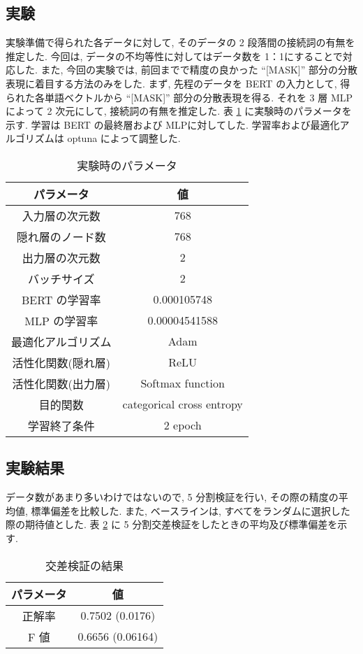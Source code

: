 \subsection{実験}
実験準備で得られた各データに対して, そのデータの 2 段落間の接続詞の有無を推定した.
今回は, データの不均等性に対してはデータ数を 1：1にすることで対応した.
また, 今回の実験では, 前回までで精度の良かった ``[MASK]'' 部分の分散表現に着目する方法のみをした.
まず, 先程のデータを BERT の入力として, 得られた各単語ベクトルから ``[MASK]'' 部分の分散表現を得る.
それを 3 層 MLP によって 2 次元にして, 接続詞の有無を推定した.
表 \ref{nn} に実験時のパラメータを示す.
学習は BERT の最終層および MLPに対してした.
学習率および最適化アルゴリズムは optuna によって調整した.
\begin{table}[ht] %
	\begin{center}
		\caption{実験時のパラメータ}
		\label{nn}
		\begin{tabular}{|c|c|} \hline
			パラメータ			& 値						\\ \hline \hline
			入力層の次元数			& 768					\\ \hline
			隠れ層のノード数		& 768 					\\ \hline
			出力層の次元数			& 2 						\\ \hline
			バッチサイズ			& 2 						\\ \hline
			BERT の学習率					& 0.000105748		\\ \hline
			MLP の学習率					& 0.00004541588					\\ \hline
			最適化アルゴリズム     & Adam         \\ \hline
			活性化関数(隠れ層)		& ReLU 					\\ \hline
			活性化関数(出力層)		& Softmax function 		\\ \hline
			目的関数				& categorical cross entropy 	\\ \hline
			学習終了条件			& 2 epoch 		\\ \hline
		\end{tabular}
	\end{center}
\end{table}
\subsection{実験結果}
データ数があまり多いわけではないので, 5 分割検証を行い, その際の精度の平均値, 標準偏差を比較した.
また, ベースラインは, すべてをランダムに選択した際の期待値とした.
表 \ref{kekka} に 5 分割交差検証をしたときの平均及び標準偏差を示す.
\begin{table}[ht] %
	\begin{center}
		\caption{交差検証の結果}
		\label{kekka}
		\begin{tabular}{|c|c|} \hline
			パラメータ			& 値						\\ \hline \hline
			正解率		& 0.7502 (0.0176)					\\ \hline
			F 値		& 0.6656 (0.06164)				\\ \hline
		\end{tabular}
	\end{center}
\end{table}
